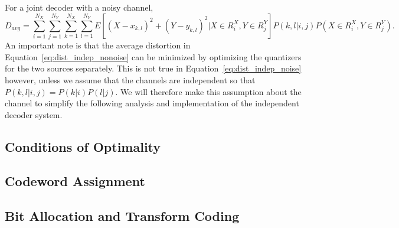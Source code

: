 \documentclass[10pt]{article}
\begin{document}
For a joint decoder with a noisy channel,
\begin{equation}
    \label{eq:dist_joint_noise}
    D_{avg} = \sum_{i=1}^{N_X}\sum_{j=1}^{N_Y}\sum_{k=1}^{N_X}\sum_{l=1}^{N_Y} E[{(X-x_{k,l})}^2 +
    {(Y-y_{k,l})}^2 | X\in R_i^X, Y\in R_j^Y]P(k,l|i,j)P(X\in R_i^X, Y\in R_j^Y).
\end{equation}
An important note is that the average distortion in Equation~\ref{eq:dist_indep_nonoise} can be minimized by optimizing the quantizers for the two sources separately. This is not true in Equation~\ref{eq:dist_indep_noise} however, unless we assume that the channels are independent so that $P(k,l|i,j) = P(k|i)P(l|j)$. We will therefore make this assumption about the channel to simplify the following analysis and implementation of the independent decoder system.

\subsection{Conditions of Optimality}
\label{sec:optim_conds_deriv}

\subsection{Codeword Assignment}
\label{sec:code_assign_deriv}

\subsection{Bit Allocation and Transform Coding}
\label{sec:bit_trans_deriv}
\end{document}
